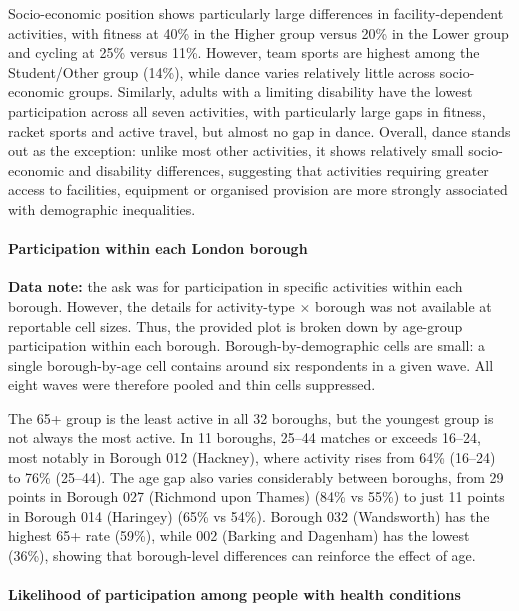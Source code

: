 \documentclass[ %
                    author={Ashrey Ashrey, Sanya Kapoor, Trisha Sharma, Yash Bhooshan Pandloskar},
                supervisor={Dr. Dalila O’Grady},
                    degree={MSc},
                     title={Using machine learning to forecast physical activity participation, volunteering and activity patterns in London},
                  subtitle={},
                      type={},
                      year={2021}]{dissertation}
\begin{document}
Socio-economic position shows particularly large differences in facility-dependent activities, with fitness at 40\% in the Higher group versus 20\% in the Lower group and cycling at 25\% versus 11\%. However, team sports are highest among the Student/Other group (14\%), while dance varies relatively little across socio-economic groups. Similarly, adults with a limiting disability have the lowest participation across all seven activities, with particularly large gaps in fitness, racket sports and active travel, but almost no gap in dance. Overall, dance stands out as the exception: unlike most other activities, it shows relatively small socio-economic and disability differences, suggesting that activities requiring greater access to facilities, equipment or organised provision are more strongly associated with demographic inequalities.

\noindent
\paragraph{Participation within each London borough}

\noindent

\textbf{Data note:} the ask was for participation in specific activities within each borough. However, the details for activity-type $\times$ borough was not available at reportable cell sizes. Thus, the provided plot is broken down by age-group participation within each borough. Borough-by-demographic cells are small: a single borough-by-age cell contains around six respondents in a given wave. All eight waves were therefore pooled and thin cells suppressed.

The 65+ group is the least active in all 32 boroughs, but the youngest group is not always the most active. In 11 boroughs, 25--44 matches or exceeds 16--24, most notably in Borough 012 (Hackney), where activity rises from 64\% (16--24) to 76\% (25--44). The age gap also varies considerably between boroughs, from 29 points in Borough 027 (Richmond upon Thames) (84\% vs 55\%) to just 11 points in Borough 014 (Haringey) (65\% vs 54\%). Borough 032 (Wandsworth) has the highest 65+ rate (59\%), while 002 (Barking and Dagenham) has the lowest (36\%), showing that borough-level differences can reinforce the effect of age.

\noindent
\paragraph{Likelihood of participation among people with health conditions}
\end{document}
